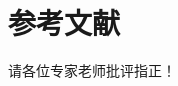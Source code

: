 \documentclass{beamer}
\begin{document}
\section{参考文献}

\begin{frame}[allowframebreaks]
    
    \tiny
\end{frame}

\begin{frame}
    \begin{center}
        {\Huge 请各位专家老师批评指正！}
    \end{center}
\end{frame}
\end{document}
